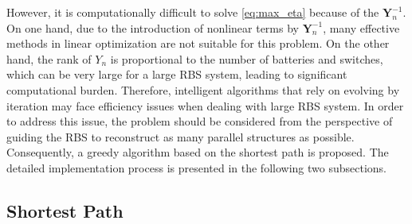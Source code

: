 \documentclass{article}
\begin{document}
However, it is computationally difficult to solve \ref{eq:max_eta} because of the $\bm{Y}_n^{-1}$.
On one hand, due to the introduction of nonlinear terms by $\bm{Y}_n^{-1}$, many effective methods in linear optimization are not suitable for this problem.
On the other hand, the rank of $Y_{n}$ is proportional to the number of batteries and switches, which can be very large for a large RBS system, leading to significant computational burden.
Therefore, intelligent algorithms that rely on evolving by iteration may face efficiency issues when dealing with large RBS system.
In order to address this issue, the problem should be considered from the perspective of guiding the RBS to reconstruct as many parallel structures as possible.
Consequently, a greedy algorithm based on the shortest path is proposed. 
The detailed implementation process is presented in the following two subsections.


\subsection{Shortest Path}
\end{document}
